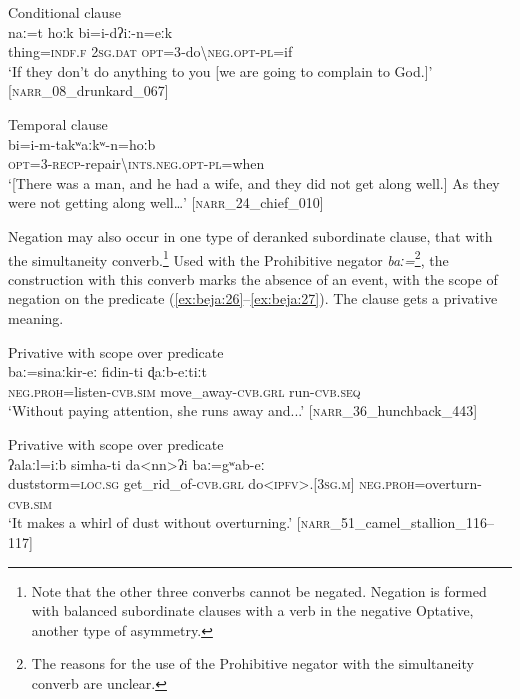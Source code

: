 \documentclass[output=paper,colorlinks,citecolor=brown]{langscibook}
\begin{document}
\ea\label{ex:beja:24}
{Conditional clause}\\
    \gll naː=t hoːk bi=i-dʔiː-n=eːk\\
         thing=\textsc{indf.f} \textsc{2sg.dat} \textsc{opt=3}-do{\textbackslash}\textsc{neg.opt-pl}=if \\
    \glt `If they don’t do anything to you [we are going to complain to God.]' [\textsc{narr}\_08\_drunkard\_067]
\z 

\ea\label{ex:beja:25}
{Temporal clause}\\
    \gll bi=i-m-takʷaːkʷ-n=hoːb\\
         \textsc{opt=3-recp}-repair{\textbackslash}\textsc{ints.neg.opt-pl}=when\\
    \glt `[There was a man, and he had a wife, and they did not get along well.] As they were not getting along well…' [\textsc{narr}\_24\_chief\_010]
\z

\newpage
Negation may also occur in one type of deranked subordinate clause, that with the simultaneity converb.\footnote{Note that the other three converbs cannot be negated. Negation is formed with balanced subordinate clauses with a verb in the negative Optative, another type of asymmetry.} Used with the Prohibitive negator \textit{baː=}\footnote{The reasons for the use of the Prohibitive negator with the simultaneity converb are unclear.}, the construction with this converb marks the absence of an event, with the scope of negation on the predicate (\ref{ex:beja:26}--\ref{ex:beja:27}). The clause gets a privative meaning.

\ea\label{ex:beja:26}
{Privative with scope over predicate}\\
    \gll baː=sinaːkir-eː fidin-ti ɖaːb-eːtiːt\\
         \textsc{neg.proh}=listen-\textsc{cvb.sim} move\_away-\textsc{cvb.grl} run-\textsc{cvb.seq}\\
    \glt `Without paying attention, she runs away and...' [\textsc{narr}\_36\_hunchback\_443] 
\z 

\ea\label{ex:beja:27} 
{Privative with scope over predicate}\\
    \gll ʔalaːl=iːb simha-ti da<nn>ʔi baː=gʷab-eː\\
         duststorm=\textsc{loc.sg} get\_rid\_of-\textsc{cvb.grl} do<\textsc{ipfv}>.[\textsc{3sg.m}] \textsc{neg.proh}=overturn-\textsc{cvb.sim}\\
    \glt `It makes a whirl of dust without overturning.' [\textsc{narr}\_51\_camel\_stallion\_116–117]
\z
\end{document}

